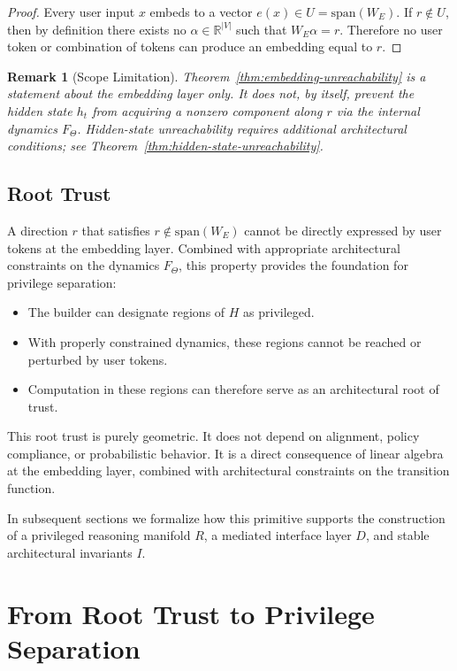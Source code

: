 \documentclass[11pt,a4paper]{article}
\newtheorem*{remark}{Remark}
\begin{document}
\begin{proof}
Every user input $x$ embeds to a vector $e(x) \in U = \text{span}(W_E)$. If $r \notin U$, then by definition there exists no $\alpha \in \mathbb{R}^{|V|}$ such that $W_E \alpha = r$. Therefore no user token or combination of tokens can produce an embedding equal to $r$.
\end{proof}

\begin{remark}[Scope Limitation]
Theorem~\ref{thm:embedding-unreachability} is a statement about the embedding layer only. It does not, by itself, prevent the hidden state $h_t$ from acquiring a nonzero component along $r$ via the internal dynamics $F_\Theta$. Hidden-state unreachability requires additional architectural conditions; see Theorem~\ref{thm:hidden-state-unreachability}.
\end{remark}

\subsection{Root Trust}

A direction $r$ that satisfies $r \notin \text{span}(W_E)$ cannot be directly expressed by user tokens at the embedding layer. Combined with appropriate architectural constraints on the dynamics $F_\Theta$, this property provides the foundation for privilege separation:

\begin{itemize}
    \item The builder can designate regions of $H$ as privileged.
    \item With properly constrained dynamics, these regions cannot be reached or perturbed by user tokens.
    \item Computation in these regions can therefore serve as an architectural root of trust.
\end{itemize}

This root trust is purely geometric. It does not depend on alignment, policy compliance, or probabilistic behavior. It is a direct consequence of linear algebra at the embedding layer, combined with architectural constraints on the transition function.

In subsequent sections we formalize how this primitive supports the construction of a privileged reasoning manifold $R$, a mediated interface layer $D$, and stable architectural invariants $I$.

\section{From Root Trust to Privilege Separation}
\end{document}
